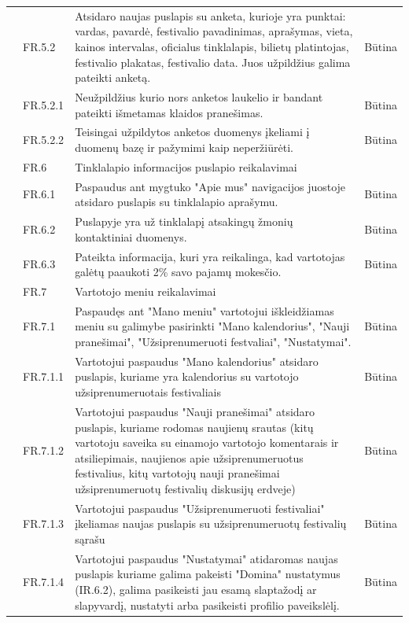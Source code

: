 \documentclass{VUMIFPSkursinis}
\begin{document}
\begin{longtable}{|p{1cm}|p{3cm}|p{9cm}|c|}
 & FR.5.2 & Atsidaro naujas puslapis su anketa, kurioje yra punktai: vardas, pavardė, festivalio pavadinimas, aprašymas, vieta, kainos intervalas, oficialus tinklalapis, bilietų platintojas, festivalio plakatas, festivalio data. Juos užpildžius galima pateikti anketą. & Būtina \\ \cline{2-4} 
 & FR.5.2.1 & Neužpildžius kurio nors anketos laukelio ir bandant pateikti išmetamas klaidos pranešimas. & Būtina \\ \cline{2-4} 
 & FR.5.2.2 & Teisingai užpildytos anketos duomenys įkeliami į duomenų bazę ir pažymimi kaip neperžiūrėti. & Būtina \\ \cline{2-4} 
 &  \cellcolor{light-gray}FR.6 & \multicolumn{2}{l|}{ \cellcolor{light-gray}Tinklalapio informacijos puslapio reikalavimai} \\ \cline{2-4} 
 & FR.6.1 & Paspaudus ant mygtuko "Apie mus" navigacijos juostoje atsidaro puslapis su tinklalapio aprašymu. & Būtina \\ \cline{2-4} 
 & FR.6.2 & Puslapyje yra už tinklalapį atsakingų žmonių kontaktiniai duomenys. & Būtina \\ \cline{2-4} 
 & FR.6.3 & Pateikta informacija, kuri yra reikalinga, kad vartotojas galėtų paaukoti 2\% savo pajamų mokesčio. & Būtina \\ \cline{2-4} 
 & \cellcolor{light-gray} FR.7 & \multicolumn{2}{l|}{ \cellcolor{light-gray}Vartotojo meniu reikalavimai} \\ \cline{2-4} 
 & FR.7.1 & Paspaudęs ant "Mano meniu" vartotojui iškleidžiamas meniu su galimybe pasirinkti "Mano kalendorius", "Nauji pranešimai", "Užsiprenumeruoti festvaliai", "Nustatymai". & Būtina \\ \cline{2-4} 
 & FR.7.1.1 & Vartotojui paspaudus "Mano kalendorius" atsidaro puslapis, kuriame yra kalendorius su vartotojo užsiprenumeruotais festivaliais & Būtina \\ \cline{2-4} 
 & FR.7.1.2 & Vartotojui paspaudus "Nauji pranešimai" atsidaro puslapis, kuriame rodomas naujienų srautas (kitų vartotoju saveika su einamojo vartotojo komentarais ir atsiliepimais, naujienos apie užsiprenumeruotus festivalius, kitų vartotojų nauji pranešimai užsiprenumeruotų festivalių diskusijų erdveje) & Būtina \\ \cline{2-4} 
 & FR.7.1.3 & Vartotojui paspaudus "Užsiprenumeruoti festivaliai" įkeliamas naujas puslapis su užsiprenumeruotų festivalių sąrašu & Būtina \\ \cline{2-4} 
 & FR.7.1.4 & Vartotojui paspaudus "Nustatymai" atidaromas naujas puslapis kuriame galima pakeisti "Domina" nustatymus (IR.6.2), galima pasikeisti jau esamą slaptažodį ar slapyvardį, nustatyti arba pasikeisti profilio paveikslėlį. & Būtina \\ \cline{2-4} 

\end{longtable}
\end{document}

